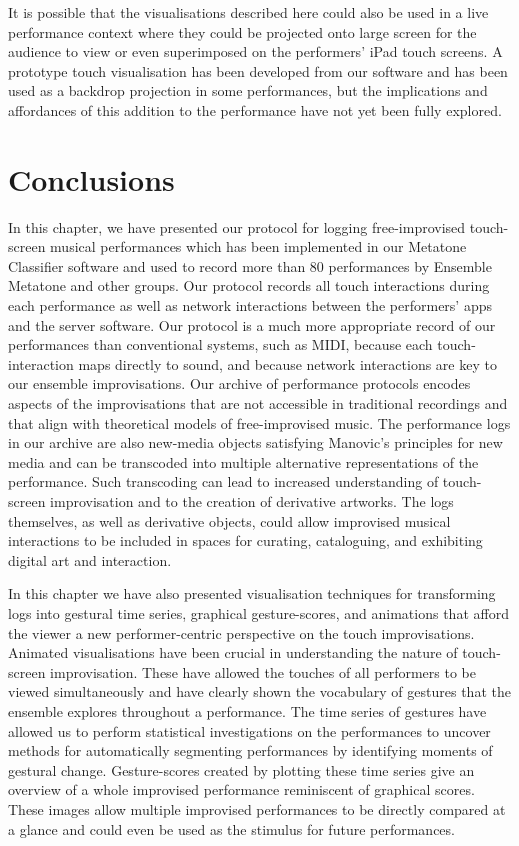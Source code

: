 \documentclass[graybox]{svmult}
\begin{document}
It is possible that the visualisations described here could also be used in a live
performance context where they could be projected onto large screen for the audience to
view or even superimposed on the performers' iPad touch screens. A
prototype touch visualisation has been developed from our software and
has been used as a backdrop projection in some performances, but the
implications and affordances of this addition to the performance have
not yet been fully explored.

\section{Conclusions}

In this chapter, we have presented our protocol for logging
free-improvised touch-screen musical performances which has been
implemented in our Metatone Classifier software and used to record
more than 80 performances by Ensemble Metatone and other groups. Our
protocol records all touch interactions during each performance as
well as network interactions between the performers' apps and the
server software. Our protocol is a much more appropriate record of our
performances than conventional systems, such as MIDI, because each
touch-interaction maps directly to sound, and because network
interactions are key to our ensemble improvisations. Our archive of
performance protocols encodes aspects of the improvisations that are
not accessible in traditional recordings and that align with
theoretical models of free-improvised music. The performance logs in
our archive are also new-media objects satisfying Manovic's principles
for new media and can be transcoded into multiple alternative
representations of the performance. Such transcoding can lead to
increased understanding of touch-screen improvisation and to the
creation of derivative artworks.
The logs themselves, as well as derivative objects, could allow
improvised musical interactions to be included in spaces for curating,
cataloguing, and exhibiting digital art and interaction.


In this chapter we have also presented visualisation techniques for
transforming logs into gestural time series, graphical gesture-scores,
and animations that afford the viewer a new performer-centric
perspective on the touch improvisations. Animated visualisations have
been crucial in understanding the nature of touch-screen
improvisation. These have allowed the touches of all performers to be
viewed simultaneously and have clearly shown the vocabulary of
gestures that the ensemble explores throughout a performance. The time
series of gestures have allowed us to perform statistical
investigations on the performances to uncover methods for
automatically segmenting performances by identifying moments of
gestural change. Gesture-scores created by plotting these time series
give an overview of a whole improvised performance reminiscent of
graphical scores. These images allow multiple improvised performances
to be directly compared at a glance and could even be used as the
stimulus for future performances.
\end{document}
